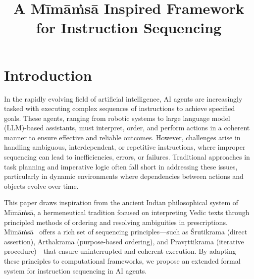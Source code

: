 \documentclass[a4paper,11pt]{lmcs}
\title{A M\={i}m\={a}\.{m}s\={a} Inspired Framework for Instruction Sequencing}
\author{}
\newcommand{\mimamsa}{M\={i}m\={a}\.ms\={a}}
\begin{document}
\maketitle

\begin{abstract}

\end{abstract}

\section{Introduction}

In the rapidly evolving field of artificial intelligence, AI agents are increasingly tasked with executing complex sequences of instructions to achieve specified goals. These agents, ranging from robotic systems to large language model (LLM)-based assistants, must interpret, order, and perform actions in a coherent manner to ensure effective and reliable outcomes. However, challenges arise in handling ambiguous, interdependent, or repetitive instructions, where improper sequencing can lead to inefficiencies, errors, or failures. Traditional approaches in task planning and imperative logic often fall short in addressing these issues, particularly in dynamic environments where dependencies between actions and objects evolve over time.

This paper draws inspiration from the ancient Indian philosophical system of \mimamsa, a hermeneutical tradition focused on interpreting Vedic texts through principled methods of ordering and resolving ambiguities in prescriptions. \mimamsa~ offers a rich set of sequencing principles—such as Śrutikrama (direct assertion), Arthakrama (purpose-based ordering), and Pravṛttikrama (iterative procedure)—that ensure uninterrupted and coherent execution. By adapting these principles to computational frameworks, we propose an extended formal system for instruction sequencing in AI agents.
\end{document}
